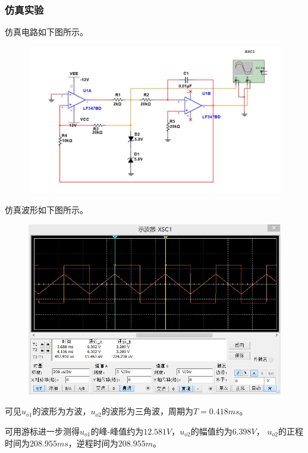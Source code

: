\documentclass[12pt,a4paper]{article}
\begin{document}
\begin{spacing}{1.3}
\subsubsection{仿真实验}
仿真电路如下图所示。
\begin{figure}[H]
\centering
\includegraphics[width=\textwidth]{8-.jpg}
\end{figure}
仿真波形如下图所示。
\begin{figure}[H]
\centering
\includegraphics[width=\textwidth]{9-.jpg}
\end{figure}
可见$u_{o1}$的波形为方波，$u_{o2}$的波形为三角波，周期为$T=0.418ms$。\par
可用游标进一步测得$u_{o1}$的峰-峰值约为$12.581V$，$u_{o2}$的幅值约为$6.398V$，
$u_{o2}$的正程时间为$208.955ms$，逆程时间为$208.955m$。

\end{spacing}
\end{document}
